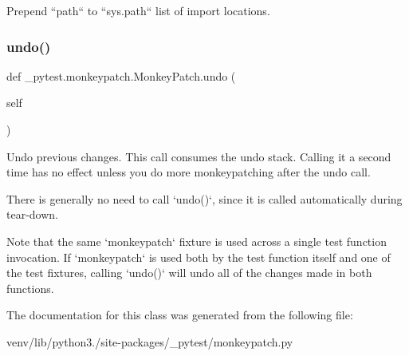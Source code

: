 \begin{DoxyVerb}Prepend ``path`` to ``sys.path`` list of import locations. \end{DoxyVerb}
 \mbox{\label{class__pytest_1_1monkeypatch_1_1_monkey_patch_a0c15865c3de639e2501f49d164aaf7c4}} 
\subsubsection{\texorpdfstring{undo()}{undo()}}
{\footnotesize\ttfamily def \+\_\+pytest.\+monkeypatch.\+Monkey\+Patch.\+undo (\begin{DoxyParamCaption}\item[{}]{self }\end{DoxyParamCaption})}

\begin{DoxyVerb}Undo previous changes.  This call consumes the
undo stack. Calling it a second time has no effect unless
you do more monkeypatching after the undo call.

There is generally no need to call `undo()`, since it is
called automatically during tear-down.

Note that the same `monkeypatch` fixture is used across a
single test function invocation. If `monkeypatch` is used both by
the test function itself and one of the test fixtures,
calling `undo()` will undo all of the changes made in
both functions.
\end{DoxyVerb}
 

The documentation for this class was generated from the following file\+:\begin{DoxyCompactItemize}
\item 
venv/lib/python3./site-\/packages/\+\_\+pytest/monkeypatch.\+py\end{DoxyCompactItemize}
